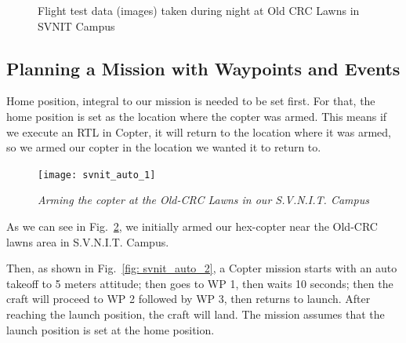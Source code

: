 \begin{figure}[h]
	\hfill
	\hfill
	\hfill
	\caption{\label{fig: auto_self_II}Flight test data (images) taken during night at Old CRC Lawns in SVNIT Campus}
\end{figure} 


\subsection{Planning a Mission with Waypoints and Events}

Home position, integral to our mission is needed to be set first. For that, the home position is set as the location where the copter was armed. This means if we execute an RTL in Copter, it will return to the location where it was armed, so we armed our copter in the location we wanted it to return to.
\begin{figure}[h]
	\texttt{[image: svnit\_auto\_1]}
	\centering
	\caption{\label{fig: svnit_auto_1}\textit{Arming the copter at the Old-CRC Lawns in our S.V.N.I.T. Campus}}
\end{figure}
As we can see in Fig.~\ref{fig: svnit_auto_1}, we initially armed our hex-copter near the Old-CRC lawns area in S.V.N.I.T. Campus. 

Then, as shown in Fig.~\ref{fig: svnit_auto_2}, a Copter mission starts with an auto takeoff to 5 meters attitude; then goes to WP 1, then waits 10 seconds; then the craft will proceed to WP 2 followed by WP 3, then returns to launch. After reaching the launch position, the craft will land. The mission assumes that the launch position is set at the home position.

